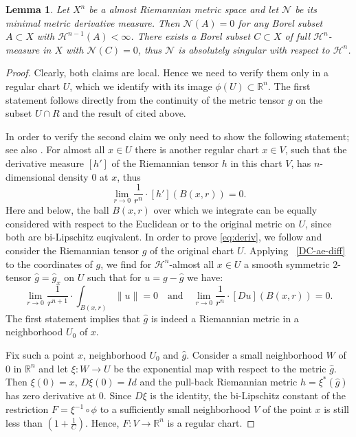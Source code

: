 \documentclass[12pt,leqno,intlimits]{amsart}
\numberwithin{equation}{section}
\newtheorem{lem}[thm]{Lemma}
\theoremstyle{definition}
\theoremstyle{remark}
\newcommand{\R}{\mathbb{R}}
\def\:{\colon}
\begin{document}
\begin{lem} \label{lem:minderiv}
Let $X^n$ be a almost Riemannian metric space and let $\mathcal N$ be its minimal metric derivative measure.
Then $\mathcal N (A)=0$ for any Borel subset $A\subset X$ with $\mathcal H^{n-1} (A)<\infty$.
There exists a Borel subset $C\subset X$ of full $\mathcal H^n$-measure in $X$ with
$\mathcal N(C)=0$, thus $\mathcal N$ is absolutely singular with respect to $\mathcal H^n$.
\end{lem}

\begin{proof}
Clearly, both claims are local. Hence we need to verify them only in a regular chart $U$, which we identify with its image $\phi (U) \subset \R^n$. The first statement
follows directly from the continuity of the metric tensor $g$ on the subset $U\cap R$ and the result of \cite{Goffmann}
cited above.

In order to verify the second claim we only need to show the following statement;
see also \cite[Section 1.6]{Evans}.
For almost all $x\in U$ there is another
regular chart $x\in V$, such that the derivative measure $[h']$ of the Riemannian tensor $h$ in this chart $V$, has $n$-dimensional density $0$
at $x$, thus
\begin{equation} \label{eq:deriv}
\lim _{r\to 0} \frac 1 {r^n} \cdot {[h'] (B (x,r))} =0 .
\end{equation}
Here and below, the ball $B (x,r)$ over which we integrate can be equally considered with respect to the Euclidean or to the original metric on $U$, since both are bi-Lipschitz euqivalent.
In order to prove \eqref{eq:deriv}, we follow \cite[Section 4.2]{Per-DC} and consider the Riemannian tensor $g$ of the original chart $U$. Applying ~\eqref{DC-ae-diff} to the coordinates of $g$, we find for $\mathcal H^n$-almost all
$x\in U$ a smooth symmetric $2$-tensor $\hat g =\hat g_x$ on $U$ such that for
$u=g-\hat g$ we have:
\begin{equation} \label{eq:u}
\lim_{r\to 0}\frac 1 {r^{n+1}}\cdot \int _{B(x,r)} \|u\| =0
\quad\text{and}\quad
\lim _{r\to 0} \frac 1 {r^n} \cdot [Du] (B (x,r)) =0  .
\end{equation}
The first statement implies that $\hat g$ is indeed a Riemannian metric in a neighborhood $U_0$ of $x$.

Fix such a point $x$, neighborhood $U_0$ and $\hat g$.
Consider a small neighborhood $W$ of $0$ in $\R^n$ and let $\xi \:W\to U$ be the exponential map with respect to the metric
$\hat g$. Then $\xi (0)=x$, $D\xi (0) =Id$ and the pull-back Riemannian metric $\hat h= \xi^{\ast} (\hat g)$ has zero derivative at $0$. Since $D\xi$ is the identity, the bi-Lipschitz constant of the restriction $F=\xi ^{-1} \circ \phi$ to a sufficiently
small neighborhood $V$ of the point $x$ is still less than $(1 + \frac 1 C)$.
Hence, $F\:V\to \R^n$ is a regular chart.


\end{proof}
\end{document}
